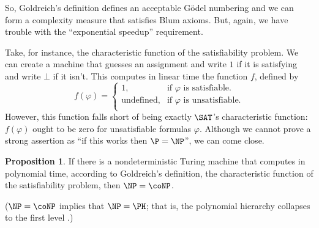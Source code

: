 \documentclass[12pt]{article}
\theoremstyle{definition}
\newtheorem{proposition}[definition]{Proposition}
\begin{document}
So, Goldreich's definition defines an acceptable Gödel numbering
and we can form a complexity measure that satisfies Blum axioms.
But, again,
we have trouble with the ``exponential speedup'' requirement.

Take, for instance,
the characteristic function of the satisfiability problem.
We can create a machine that guesses an assignment
and write $1$ if it is satisfying and write $\bot$ if it isn't.
This computes in linear time the function $f$, defined by
\begin{equation*}
    f(\varphi) = \begin{cases}
        1, & \text{if $\varphi$ is satisfiable.} \\
        \text{undefined}, & \text{if $\varphi$ is unsatisfiable.} \\
    \end{cases}
\end{equation*}
However,
this function falls short of being exactly $\SAT$'s characteristic function:
$f(\varphi)$ ought to be zero for unsatisfiable formulas $\varphi$.
Although we cannot prove a strong assertion as
``if this works then $\P = \NP$'',
we can come close.

\begin{proposition}
    If there is a nondeterministic Turing machine
    that computes in polynomial time, according to Goldreich's definition,
    the characteristic function of the satisfiability problem,
    then $\NP = \coNP$.
\end{proposition}

($\NP = \coNP$ implies that $\NP = \PH$; that is,
the polynomial hierarchy collapses to the first level \cite[p.~280]{Kozen2006}.)
\end{document}
